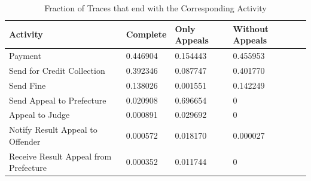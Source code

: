 \documentclass[12pt]{report}
\begin{document}
\begin{table}[H]
\centering
\begin{tabular}{|l|l|l|l|l|}
\hline \textbf{Activity} & \textbf{Complete} & \textbf{Only Appeals} & \textbf{Without Appeals} \\
\hline Payment  & 0.446904 & 0.154443 & 0.455953\\
\hline Send for Credit Collection & 0.392346 & 0.087747 & 0.401770\\
\hline Send Fine  & 0.138026 & 0.001551 & 0.142249\\
\hline Send Appeal to Prefecture  & 0.020908 & 0.696654 & 0\\
\hline Appeal to Judge & 0.000891 & 0.029692 &0\\
\hline Notify Result Appeal to Offender & 0.000572 & 0.018170 & 0.000027\\
\hline Receive Result Appeal from Prefecture & 0.000352 & 0.011744 & 0\\
\hline
\end{tabular}
\caption{Fraction of Traces that end with the Corresponding Activity}
\label{tab:1c_end}
\end{table}
\end{document}
